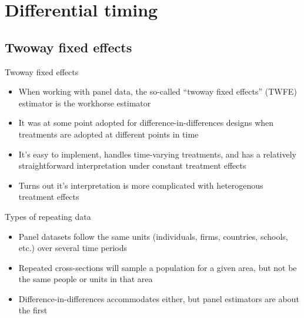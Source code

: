 \documentclass{beamer}
\begin{document}



\section{Differential timing}
\subsection{Twoway fixed effects }


\begin{frame}{Twoway fixed effects}

\begin{itemize}
\item When working with panel data, the so-called ``twoway fixed effects'' (TWFE) estimator is the workhorse estimator
\item It was at some point adopted for difference-in-differences designs when treatments are adopted at different points in time 
\item It's easy to implement, handles time-varying treatments, and has a relatively straightforward interpretation under constant treatment effects
\item Turns out it's interpretation is more complicated with heterogenous treatment effects
\end{itemize}

\end{frame}


\begin{frame}{Types of repeating data}

	\begin{itemize}
	\item Panel datasets follow the same units (individuals, firms, countries, schools, etc.) over several time periods
	\item Repeated cross-sections will sample a population for a given area, but not be the same people or units in that area
	\item Difference-in-differences accommodates either, but panel estimators are about the first 
	\end{itemize}
\end{frame}
\end{document}
